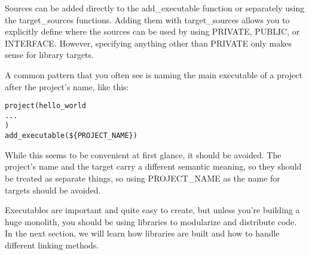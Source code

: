 Sources can be added directly to the add\_executable function or separately using the target\_sources functions. Adding them with target\_sources allows you to explicitly define where the sources can be used by using PRIVATE, PUBLIC, or INTERFACE. However, specifying anything other than PRIVATE only makes sense for library targets.

A common pattern that you often see is naming the main executable of a project after the project's name, like this:

\begin{lstlisting}[style=styleCMake]
project(hello_world
...
)
add_executable(${PROJECT_NAME})
\end{lstlisting}

While this seems to be convenient at first glance, it should be avoided. The project's name and the target carry a different semantic meaning, so they should be treated as separate things, so using PROJECT\_NAME as the name for targets should be avoided.

Executables are important and quite easy to create, but unless you're building a huge monolith, you should be using libraries to modularize and distribute code. In the next section, we will learn how libraries are built and how to handle different linking methods.





























